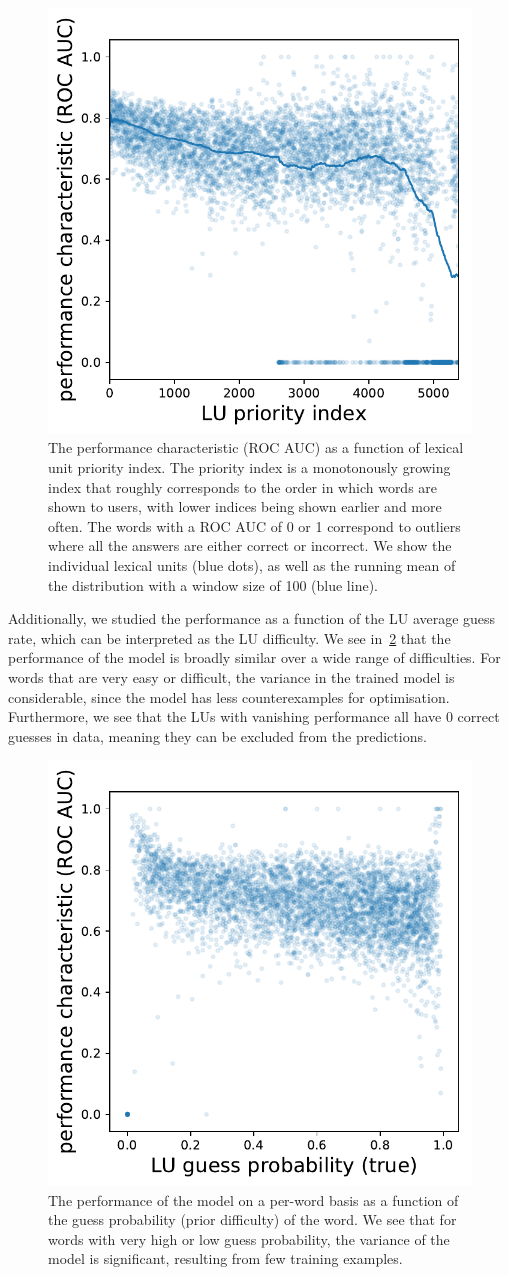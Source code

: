 \begin{figure}[ht]
\centering
\includegraphics[width=0.5\linewidth]{figures/lingvist/lu_roc_prio.pdf}
\caption[Performance of knowledge estimation as a function of LU priority]{The performance characteristic (ROC AUC) as a function of lexical unit priority index. The priority index is a monotonously growing index that roughly corresponds to the order in which words are shown to users, with lower indices being shown earlier and more often. The words with a ROC AUC of 0 or 1 correspond to outliers where all the answers are either correct or incorrect. We show the individual lexical units (blue dots), as well as the running mean of the distribution with a window size of 100 (blue line).}
\label{fig:lu_roc_prio}
\end{figure}

Additionally, we studied the performance as a function of the LU average guess rate, which can be interpreted as the LU difficulty. We see in~\cref{fig:lu_roc_guess_proba} that the performance of the model is broadly similar over a wide range of difficulties. For words that are very easy or difficult, the variance in the trained model is considerable, since the model has less counterexamples for optimisation. Furthermore, we see that the LUs with vanishing performance all have 0 correct guesses in data, meaning they can be excluded from the predictions.

\begin{figure}[ht]
\centering
\includegraphics[width=0.5\linewidth]{figures/lingvist/lu_roc_guess_proba.pdf}
\caption[Model performance on a per-LU basis as a function of average LU guess probability]{The performance of the model on a per-word basis as a function of the guess probability (prior difficulty) of the word. We see that for words with very high or low guess probability, the variance of the model is significant, resulting from few training examples.}
\label{fig:lu_roc_guess_proba}
\end{figure}

